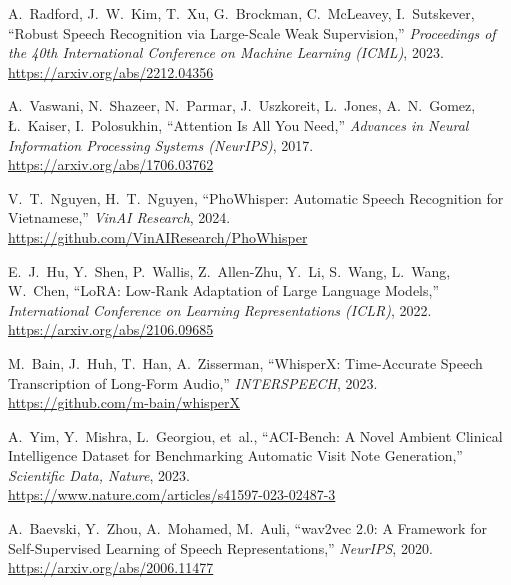 \documentclass[12pt,a4paper]{article}
\begin{document}
\begin{enumerate}[label={[A\arabic*]}]

\item A.~Radford, J.~W.~Kim, T.~Xu, G.~Brockman, C.~McLeavey, I.~Sutskever,
``Robust Speech Recognition via Large-Scale Weak Supervision,''
\textit{Proceedings of the 40th International Conference on Machine Learning (ICML)}, 2023.\\
\url{https://arxiv.org/abs/2212.04356}

\item A.~Vaswani, N.~Shazeer, N.~Parmar, J.~Uszkoreit, L.~Jones, A.~N.~Gomez, Ł.~Kaiser, I.~Polosukhin,
``Attention Is All You Need,''
\textit{Advances in Neural Information Processing Systems (NeurIPS)}, 2017.\\
\url{https://arxiv.org/abs/1706.03762}

\item V.~T.~Nguyen, H.~T.~Nguyen,
``PhoWhisper: Automatic Speech Recognition for Vietnamese,''
\textit{VinAI Research}, 2024.\\
\url{https://github.com/VinAIResearch/PhoWhisper}

\item E.~J.~Hu, Y.~Shen, P.~Wallis, Z.~Allen-Zhu, Y.~Li, S.~Wang, L.~Wang, W.~Chen,
``LoRA: Low-Rank Adaptation of Large Language Models,''
\textit{International Conference on Learning Representations (ICLR)}, 2022.\\
\url{https://arxiv.org/abs/2106.09685}

\item M.~Bain, J.~Huh, T.~Han, A.~Zisserman,
``WhisperX: Time-Accurate Speech Transcription of Long-Form Audio,''
\textit{INTERSPEECH}, 2023.\\
\url{https://github.com/m-bain/whisperX}

\item A.~Yim, Y.~Mishra, L.~Georgiou, et~al.,
``ACI-Bench: A Novel Ambient Clinical Intelligence Dataset for Benchmarking Automatic Visit Note Generation,''
\textit{Scientific Data, Nature}, 2023.\\
\url{https://www.nature.com/articles/s41597-023-02487-3}

\item A.~Baevski, Y.~Zhou, A.~Mohamed, M.~Auli,
``wav2vec 2.0: A Framework for Self-Supervised Learning of Speech Representations,''
\textit{NeurIPS}, 2020.\\
\url{https://arxiv.org/abs/2006.11477}

\end{enumerate}
\end{document}
